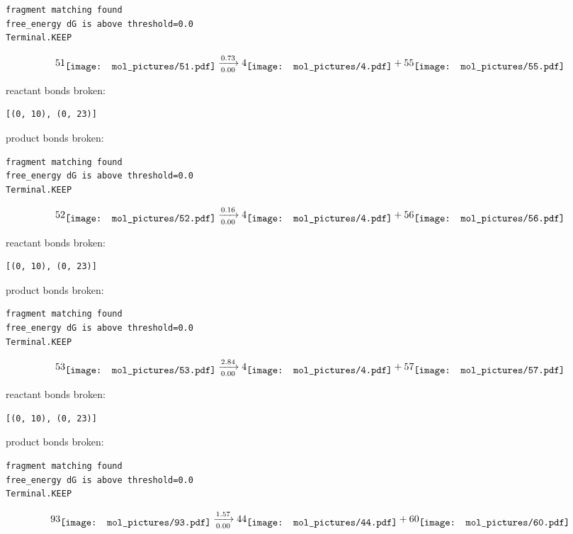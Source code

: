 \documentclass{article}
\begin{document}
\vspace{1cm}
\begin{verbatim}
fragment matching found
free_energy dG is above threshold=0.0
Terminal.KEEP
\end{verbatim}
$$
51
\raisebox{-.5\height}{\texttt{[image: mol\_pictures/51.pdf]}}
\xrightarrow[0.00]{0.73}
4
\raisebox{-.5\height}{\texttt{[image: mol\_pictures/4.pdf]}}
+
55
\raisebox{-.5\height}{\texttt{[image: mol\_pictures/55.pdf]}}
$$


reactant bonds broken:\begin{verbatim}
[(0, 10), (0, 23)]
\end{verbatim}
product bonds broken:



\vspace{1cm}
\begin{verbatim}
fragment matching found
free_energy dG is above threshold=0.0
Terminal.KEEP
\end{verbatim}
$$
52
\raisebox{-.5\height}{\texttt{[image: mol\_pictures/52.pdf]}}
\xrightarrow[0.00]{0.16}
4
\raisebox{-.5\height}{\texttt{[image: mol\_pictures/4.pdf]}}
+
56
\raisebox{-.5\height}{\texttt{[image: mol\_pictures/56.pdf]}}
$$


reactant bonds broken:\begin{verbatim}
[(0, 10), (0, 23)]
\end{verbatim}
product bonds broken:



\vspace{1cm}
\begin{verbatim}
fragment matching found
free_energy dG is above threshold=0.0
Terminal.KEEP
\end{verbatim}
$$
53
\raisebox{-.5\height}{\texttt{[image: mol\_pictures/53.pdf]}}
\xrightarrow[0.00]{2.84}
4
\raisebox{-.5\height}{\texttt{[image: mol\_pictures/4.pdf]}}
+
57
\raisebox{-.5\height}{\texttt{[image: mol\_pictures/57.pdf]}}
$$


reactant bonds broken:\begin{verbatim}
[(0, 10), (0, 23)]
\end{verbatim}
product bonds broken:



\vspace{1cm}
\begin{verbatim}
fragment matching found
free_energy dG is above threshold=0.0
Terminal.KEEP
\end{verbatim}
$$
93
\raisebox{-.5\height}{\texttt{[image: mol\_pictures/93.pdf]}}
\xrightarrow[0.00]{1.57}
44
\raisebox{-.5\height}{\texttt{[image: mol\_pictures/44.pdf]}}
+
60
\raisebox{-.5\height}{\texttt{[image: mol\_pictures/60.pdf]}}
$$
\end{document}
